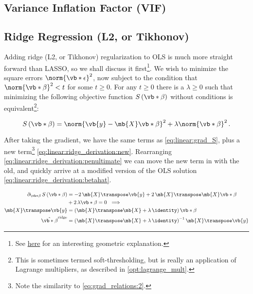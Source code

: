 \subsection{Variance Inflation Factor (VIF)}
\label{regression:linear:VIF}

\subsection{Ridge Regression (L2, or Tikhonov)}
\label{regression:linear:ridge}

Adding ridge (L2, or Tikhonov) regularization to OLS is much more straight forward than LASSO,
so we shall discuss it first\footnote{See \href{https://stats.stackexchange.com/a/164546}{here} for an interesting geometric explanation.}.
We wish to minimize the square errors $\norm{\vb*{\epsilon}}^{2}$,
now subject to the condition that $\norm{\vb*{\beta}}^{2} < t$ for some $t \geq 0$.
For any $t \geq 0$ there is a $\lambda \geq 0$ such that minimizing the following
objective function $S\left(\vb*{\beta}\right)$ without conditions is
equivalent\footnote{This is sometimes termed soft-thresholding, but is really an application of Lagrange multipliers, as described in \cref{opt:lagrange_mult}.}:

\begin{equation} \label{eq:linear:ridge}
S\left(\vb*{\beta}\right) = \norm{\vb{y} - \mb{X} \vb*{\beta}}^{2} + \lambda \norm{\vb*{\beta}}^{2}\,.
\end{equation}

After taking the gradient, we have the same terms as \cref{eq:linear:grad_S},
plus a new term\footnote{Note the similarity to \cref{eq:grad_relations:2}.} \cref{eq:linear:ridge_derivation:new}.
Rearranging \cref{eq:linear:ridge_derivation:penultimate} we can move the new term in with the old,
and quickly arrive at a modified version of the OLS solution \cref{eq:linear:ridge_derivation:betahat}.

\begin{subequations} \label{eq:linear:ridge_derivation}
\begin{align}
\partial_{\vb*{\beta}} \, S\left(\vb*{\beta}\right)
&= -2\, \mb{X}\transpose \vb{y} + 2\, \mb{X}\transpose \mb{X} \vb*{\beta} \label{eq:linear:ridge_derivation:grad_S_repeat} \\
&+ 2\,\lambda \vb*{\beta} = 0 \,\, \implies \label{eq:linear:ridge_derivation:new} \\
\mb{X}\transpose \vb{y} &= \left(\mb{X}\transpose \mb{X} + \lambda\,\identity\right) \vb*{\beta} \label{eq:linear:ridge_derivation:penultimate} \\
\hat{\vb*{\beta}}^{\text{ridge}} &= \left(\mb{X}\transpose\mb{X} + \lambda\,\identity\right)^{-1}\mb{X}\transpose \vb{y} \label{eq:linear:ridge_derivation:betahat}
\end{align}
\end{subequations}

